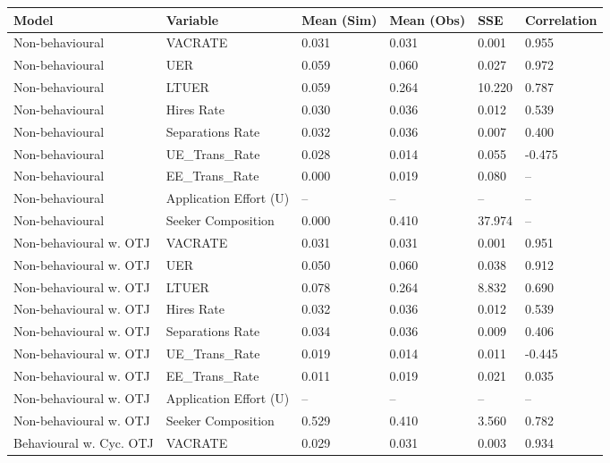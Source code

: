 \begin{table}[ht]
\centering
\begin{adjustbox}{width=\textwidth}
\begin{tabular}{llllll}
\toprule
Model & Variable & Mean (Sim) & Mean (Obs) & SSE & Correlation \\
\midrule
Non-behavioural & VACRATE & \cellcolor{yellow!25}0.031 & 0.031 & \cellcolor{yellow!25}0.001 & \cellcolor{yellow!25}0.955 \\
Non-behavioural & UER & \cellcolor{yellow!25}0.059 & 0.060 & 0.027 & \cellcolor{yellow!25}0.972 \\
Non-behavioural & LTUER & 0.059 & 0.264 & 10.220 & 0.787 \\
Non-behavioural & Hires Rate & 0.030 & 0.036 & \cellcolor{yellow!25}0.012 & 0.539 \\
Non-behavioural & Separations Rate & 0.032 & 0.036 & \cellcolor{yellow!25}0.007 & 0.400 \\
Non-behavioural & UE_Trans_Rate & 0.028 & 0.014 & 0.055 & -0.475 \\
Non-behavioural & EE_Trans_Rate & 0.000 & 0.019 & 0.080 & -- \\
Non-behavioural & Application Effort (U) & -- & -- & -- & -- \\
Non-behavioural & Seeker Composition & 0.000 & 0.410 & 37.974 & -- \\
Non-behavioural w. OTJ & VACRATE & 0.031 & 0.031 & 0.001 & 0.951 \\
Non-behavioural w. OTJ & UER & 0.050 & 0.060 & 0.038 & 0.912 \\
Non-behavioural w. OTJ & LTUER & 0.078 & 0.264 & 8.832 & 0.690 \\
Non-behavioural w. OTJ & Hires Rate & \cellcolor{yellow!25}0.032 & 0.036 & 0.012 & 0.539 \\
Non-behavioural w. OTJ & Separations Rate & \cellcolor{yellow!25}0.034 & 0.036 & 0.009 & 0.406 \\
Non-behavioural w. OTJ & UE_Trans_Rate & 0.019 & 0.014 & 0.011 & -0.445 \\
Non-behavioural w. OTJ & EE_Trans_Rate & \cellcolor{yellow!25}0.011 & 0.019 & \cellcolor{yellow!25}0.021 & 0.035 \\
Non-behavioural w. OTJ & Application Effort (U) & -- & -- & -- & -- \\
Non-behavioural w. OTJ & Seeker Composition & 0.529 & 0.410 & 3.560 & \cellcolor{yellow!25}0.782 \\
Behavioural w. Cyc. OTJ & VACRATE & 0.029 & 0.031 & 0.003 & 0.934 \\

\end{tabular}
\end{adjustbox}
\end{table}
